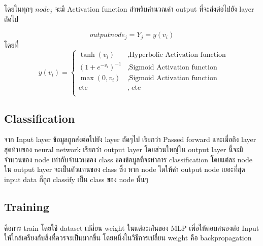 โดยในทุกๆ $node_j$ จะมี Activation function สำหรับคำนวณค่า output ที่จะส่งต่อไปยัง layer ถัดไป  

\begin{equation} output node_j =  Y_j =  y(v_i)  \end{equation}
 โดยที่  \begin{equation} ~~ y(v_i) = \begin{cases}
  \tanh(v_i)  & \text{,Hyperbolic Activation function} \\
  (1+e^{-v_i})^{-1} & \text{,Sigmoid Activation function} \\
  \max(0,v_i) & \text{,Sigmoid Activation function}\\
  \text{etc } & \text{, etc }\\
  \end{cases} \end{equation}

\subsection{Classification}
จาก Input layer ข้อมูลถูกส่งต่อไปยัง layer ถัดๆไป เรียกว่า Passed forward และเมื่อถึง
layer สุดท้ายของ neural network เรียกว่า output layer โดยส่วนใหญ่ใน output layer นี้จะมีจำนวนของ node เท่ากับจำนวนของ class ของข้อมูลที่จะทำการ classification 
โดยแต่ละ node ใน output layer จะเป็นตัวแทนของ class ซึ่ง หาก node ใดให้ค่า output node เยอะที่สุด input data ก็ถูก classify เป็น class ของ node นั้นๆ


\subsection{Training}
คือการ train โดยใช้ dataset เปลี่ยน weight ในแต่ละเส้นของ MLP เพื่อให้ตอบสนองต่อ Input ให้ใกล้เครียงกับสิ่งที่ควรจะเป็นมากขึ้น 
โดยหนึ่งในวิธีการเปลี่ยน weight คือ backpropagation
 

